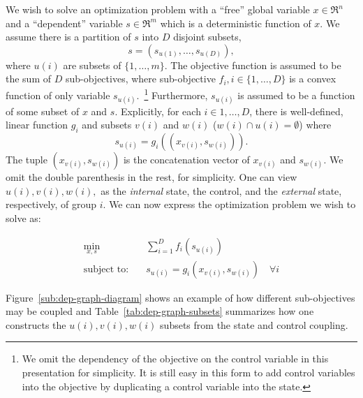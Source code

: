 We wish to solve an optimization problem with a ``free'' global variable $x \in \Re^n$ and a ``dependent'' variable $s \in \Re^m$ which is a deterministic function of $x$.
We assume there is a partition of $s$ into $D$ disjoint subsets,
\[
s=\left(s_{u\left(1\right)},\ldots,s_{u\left(D\right)}\right),
\] where $u\left(i\right)$ are subsets of $ \{1,\ldots,m\} $.
The objective function is assumed to be the sum of $D$ sub-objectives, where sub-objective $f_i, i\in \{1,\ldots,D\} $ is a convex function of only variable $s_{u\left(i\right)}$.~\footnote{We omit the dependency of the objective on the control variable in this presentation for simplicity. It is still easy in this form to add control variables into the objective by duplicating a control variable into the state.}
Furthermore, $s_{u\left(i\right)}$ is assumed to be a function of some subset of $x$ and $s$.
Explicitly, for each $i\in {1,\ldots, D} $, there is well-defined, linear function $g_i$ and subsets $v\left(i\right)$ and $w\left(i\right)$ ($w\left(i\right) \cap u\left(i\right) = \emptyset$) where 
\begin{equation}
\label{eqn:s-g-rel}
s_{u\left(i\right)} = g_i\left(\left(x_{v\left(i\right)}, s_{w\left(i\right)}\right)\right).
\end{equation}
The tuple $\left(x_{v\left(i\right)}, s_{w\left(i\right)}\right)$ is the concatenation vector of $x_{v\left(i\right)}$ and $s_{w\left(i\right)}$.
We omit the double parenthesis in the rest, for simplicity. One can view $u\left(i\right), v\left(i\right), w\left(i\right), $ as the \emph{internal} state, the control, and the \emph{external} state, respectively, of group $i$. 
We can now express the optimization problem we wish to solve as:

\begin{align}
  \label{eq:problem-statement}
  \min_{x,s} & \quad \sum_{i = 1}^D f_i\left(s_{u\left(i\right)}\right) \\
  \text{subject to:} & \quad s_{u\left(i\right)} = g_i\left(x_{v\left(i\right)}, s_{w\left(i\right)}\right) \quad \forall i
\end{align}

Figure~\ref{sub:dep-graph-diagram} shows an example of how different sub-objectives may be coupled and Table~\ref{tab:dep-graph-subsets} summarizes how one constructs the $u\left(i\right), v\left(i\right), w\left(i\right)$ subsets from the state and control coupling.

